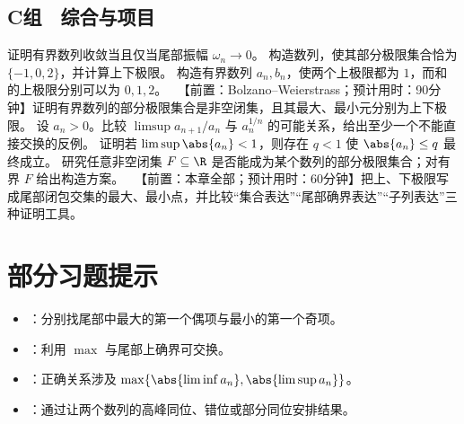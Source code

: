 \subsection*{C组　综合与项目}
\begin{enumerate}[label=\textbf{12.\arabic*.},resume]
  \mustdo 证明有界数列收敛当且仅当尾部振幅 \(\omega_n\to0\)。
  \mustdo 构造数列，使其部分极限集合恰为 \(\{-1,0,2\}\)，并计算上下极限。
  \mustdo 构造有界数列 \(a_n,b_n\)，使两个上极限都为 \(1\)，而和的上极限分别可以为 \(0,1,2\)。
  \projectdo\ 【前置：Bolzano--Weierstrass；预计用时：90分钟】证明有界数列的部分极限集合是非空闭集，且其最大、最小元分别为上下极限。
  \optionaldo 设 \(a_n>0\)。比较 \(\limsup a_{n+1}/a_n\) 与 \(a_n^{1/n}\) 的可能关系，给出至少一个不能直接交换的反例。
  \optionaldo 证明若 \(\limsup\abs{a_n}<1\)，则存在 \(q<1\) 使 \(\abs{a_n}\le q\) 最终成立。
  \opendo 研究任意非空闭集 \(F\subseteq\R\) 是否能成为某个数列的部分极限集合；对有界 \(F\) 给出构造方案。
  \projectdo\ 【前置：本章全部；预计用时：60分钟】把上、下极限写成尾部闭包交集的最大、最小点，并比较“集合表达”“尾部确界表达”“子列表达”三种证明工具。
\end{enumerate}

\section*{部分习题提示}
\begin{itemize}
 \item {}：分别找尾部中最大的第一个偶项与最小的第一个奇项。
 \item {}：利用 \(\max\) 与尾部上确界可交换。
 \item {}：正确关系涉及 \(\max\{\abs{\liminf a_n},\abs{\limsup a_n}\}\)。
 \item {}：通过让两个数列的高峰同位、错位或部分同位安排结果。
\end{itemize}
